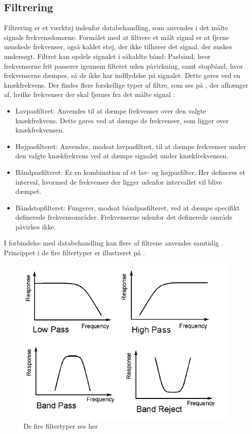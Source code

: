 \subsection{Filtrering}
Filtrering er et værktøj indenfor databehandling, som anvendes i det målte signals frekvensdomæne. Formålet med at filtrere et målt signal er at fjerne uønskede frekvenser, også kaldet støj, der ikke tilhører det signal, der ønskes undersøgt. Filtret kan opdele signalet i såkaldte bånd: Pasbånd, hvor frekvenserne frit passerer igennem filteret uden påvirkning, samt stopbånd, hvor frekvenserne dæmpes, så de ikke har indflydelse på signalet. Dette gøres ved en knækfrekvens.
Der findes flere forskellige typer af filtre, som ses på , der afhænger af, hvilke frekvenser der skal fjernes fra det målte signal \cite{Devasahayam2000}:

\begin{itemize}
	\item Lavpasfiltret: Anvendes til at dæmpe frekvenser over den valgte knækfrekvens. Dette gøres ved at dæmpe de frekvenser, som ligger over knækfrekvensen.
	\item Højpasfilteret: Anvendes, modsat lavpasfiltret, til at dæmpe frekvenser under den valgte knækfrekvens ved at dæmpe signalet under knækfrekvensen.
	\item Båndpasfilteret: Er en kombination af et lav- og højpasfilter.  Her defineres et interval, hvormed de frekvenser der ligger udenfor intervallet vil blive dæmpet.
	\item Båndstopfilteret: Fungerer, modsat båndpasfilteret, ved at dæmpe specifikt definerede frekvensområder. Frekvenserne udenfor det definerede område påvirkes ikke. 
\end{itemize}
  
I forbindelse med databehandling kan flere af filtrene anvendes samtidig \cite{Devasahayam2000}. Princippet i de fire filtertyper er illustreret på .
\begin{figure}[H]
\centering
\includegraphics[scale=0.8]{figures/bproblemanalyse/filtertyper.png}
\caption{De fire filtertyper ses her \cite{2. semester kristian}}
\label{filtertyper}
\end{figure}

